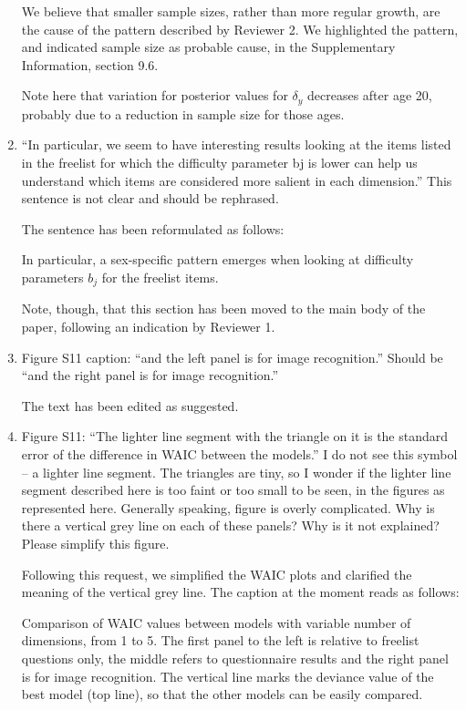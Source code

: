\documentclass{article}
\newcommand{\rev}[1]{{\color{Red}#1}}
\newcommand{\comment}[1]{{\color{Blue}#1}}
\begin{document}
\begin{enumerate}
    \comment{We believe that smaller sample sizes, rather than more regular growth, are the cause of the pattern described by Reviewer 2. We highlighted the pattern, and indicated sample size as probable cause, in the Supplementary Information, section 9.6.}

\rev{Note here that variation for posterior values for $\delta_y$ decreases after age 20, probably due to a reduction in sample size for those ages.}

    \item “In particular, we seem to have interesting results looking at the items listed in the freelist for which the difficulty parameter bj is lower can help us understand which items are considered more salient in each dimension.” This sentence is not clear and should be rephrased.
    
    \comment{The sentence has been reformulated as follows:}
    
\rev{In particular, a sex-specific pattern emerges when looking at difficulty parameters $b_j$ for the freelist items.}
    
    \comment{Note, though, that this section has been moved to the main body of the paper, following an indication by Reviewer 1.}

    \item Figure S11 caption: “and the left panel is for image recognition.” Should be “and the right panel is for image recognition.”

    \comment{The text has been edited as suggested. }

    \item Figure S11: “The lighter line segment with the triangle on it is the standard error of the difference in WAIC between the models.” I do not see this symbol – a lighter line segment. The triangles are tiny, so I wonder if the lighter line segment described here is too faint or too small to be seen, in the figures as represented here. Generally speaking, figure is overly complicated. Why is there a vertical grey line on each of these panels? Why is it not explained? Please simplify this figure.
    
    \comment{Following this request, we simplified the WAIC plots and clarified the meaning of the vertical grey line. The caption at the moment reads as follows:}
    
\rev{Comparison of WAIC values between models with variable number of dimensions, from 1 to 5. The first panel to the left is relative to freelist questions only, the middle refers to questionnaire results and the \rev{right} panel is for image recognition. The vertical line marks the deviance value of the best model (top line), so that the other models can be easily compared.}


\end{enumerate}
\end{document}
